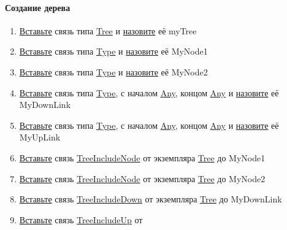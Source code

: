 \paragraph{Создание дерева}
\begin{enumerate}
      \item \hyperlink{DeepCase.InsertLink.Description}{Вставьте} связь типа
            \hyperlink{Tree}{Tree} и \hyperlink{FAQ.HowToSetName}{назовите} её
            myTree
      \item \hyperlink{DeepCase.InsertLink.Description}{Вставьте} связь типа
            \hyperlink{Type.Description}{Type} и
            \hyperlink{FAQ.HowToSetName}{назовите} её MyNode1
      \item \hyperlink{DeepCase.InsertLink.Description}{Вставьте} связь типа
            \hyperlink{Type.Description}{Type} и
            \hyperlink{FAQ.HowToSetName}{назовите} её MyNode2
      \item \hyperlink{DeepCase.InsertLink.Description}{Вставьте} связь типа
            \hyperlink{Type.Description}{Type}, с началом
            \hyperlink{Core.Any.Description}{Any}, концом
            \hyperlink{Core.Any.Description}{Any} и
            \hyperlink{FAQ.HowToSetName}{назовите} её
            MyDownLink
      \item \hyperlink{DeepCase.InsertLink.Description}{Вставьте} связь типа
            \hyperlink{Type.Description}{Type}, с началом
            \hyperlink{Core.Any.Description}{Any}, концом
            \hyperlink{Core.Any.Description}{Any} и
            \hyperlink{FAQ.HowToSetName}{назовите} её
            MyUpLink
      \item \hyperlink{DeepCase.InsertLink.Description}{Вставьте} связь
            \hyperlink{Core.TreeIncludeNode.Description}{TreeIncludeNode} от
            экземпляра \hyperlink{Core.Tree.Description}{Tree} до MyNode1
      \item \hyperlink{DeepCase.InsertLink.Description}{Вставьте} связь
            \hyperlink{Core.TreeIncludeNode.Description}{TreeIncludeNode} от
            экземпляра \hyperlink{Core.Tree.Description}{Tree} до MyNode2
      \item \hyperlink{DeepCase.InsertLink.Description}{Вставьте} связь
            \hyperlink{Core.TreeIncludeDown.Description}{TreeIncludeDown} от
            экземпляра \hyperlink{Core.Tree.Description}{Tree} до MyDownLink
      \item \hyperlink{DeepCase.InsertLink.Description}{Вставьте} связь
            \hyperlink{Core.TreeIncludeNode.Description}{TreeIncludeUp} от

\end{enumerate}
